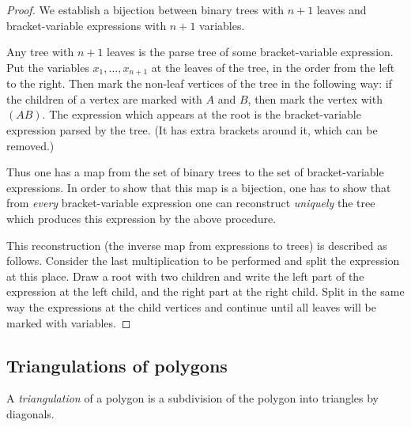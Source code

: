 \begin{page}
\setcounter{section}{4}
\setcounter{subsection}{4}
\setcounter{dfn}{5}
\label{portion:873}

\begin{proof}
We establish a bijection between binary trees with $n+1$ leaves and bracket-variable expressions with $n+1$ variables.

Any tree with $n+1$ leaves is the parse tree of some bracket-variable expression.
Put the variables $x_1, \ldots, x_{n+1}$ at the leaves of the tree, in the order from the left to the right.
Then mark the non-leaf vertices of the tree in the following way:
if the children of a vertex are marked with $A$ and $B$, then mark the vertex with $(AB)$.
The expression which appears at the root is the bracket-variable expression parsed by the tree.
(It has extra brackets around it, which can be removed.)

Thus one has a map from the set of binary trees to the set of bracket-variable expressions.
In order to show that this map is a bijection, one has to show that from \emph{every} bracket-variable expression
one can reconstruct \emph{uniquely} the tree which produces this expression by the above procedure.

This reconstruction (the inverse map from expressions to trees) is described as follows.
Consider the last multiplication to be performed and split the expression at this place.
Draw a root with two children and write the left part of the expression at the left child, and the right part at the right child.
Split in the same way the expressions at the child vertices and continue until all leaves will be marked with variables.
\end{proof}




\end{page}

\begin{page}
\setcounter{section}{4}
\setcounter{subsection}{4}
\setcounter{dfn}{5}
\label{portion:874}

\subsection{Triangulations of polygons}
A \emph{triangulation} of a polygon is a subdivision of the polygon into triangles by diagonals.


\end{page}

